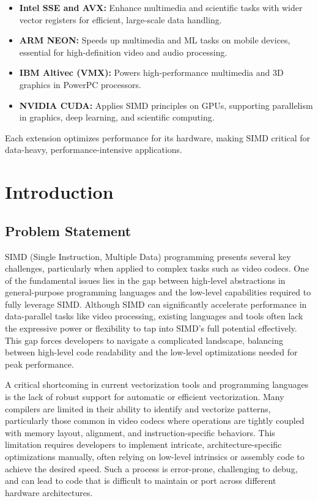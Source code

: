 \documentclass[12pt,a4paper]{article}
\begin{document}
\begin{itemize}
    \item \textbf{Intel SSE and AVX:} Enhance multimedia and scientific tasks with wider vector registers for efficient, large-scale data handling.
    
    \item \textbf{ARM NEON:} Speeds up multimedia and ML tasks on mobile devices, essential for high-definition video and audio processing.

    \item \textbf{IBM Altivec (VMX):} Powers high-performance multimedia and 3D graphics in PowerPC processors.

    \item \textbf{NVIDIA CUDA:} Applies SIMD principles on GPUs, supporting parallelism in graphics, deep learning, and scientific computing.
\end{itemize}

Each extension optimizes performance for its hardware, making SIMD critical for data-heavy, performance-intensive applications.

\section{Introduction}

\subsection{Problem Statement}
SIMD (Single Instruction, Multiple Data) programming presents several key challenges, particularly when applied to complex tasks such as video codecs. One of the fundamental issues lies in the gap between high-level abstractions in general-purpose programming languages and the low-level capabilities required to fully leverage SIMD. Although SIMD can significantly accelerate performance in data-parallel tasks like video processing, existing languages and tools often lack the expressive power or flexibility to tap into SIMD’s full potential effectively. This gap forces developers to navigate a complicated landscape, balancing between high-level code readability and the low-level optimizations needed for peak performance.

A critical shortcoming in current vectorization tools and programming languages is the lack of robust support for automatic or efficient vectorization. Many compilers are limited in their ability to identify and vectorize patterns, particularly those common in video codecs where operations are tightly coupled with memory layout, alignment, and instruction-specific behaviors. This limitation requires developers to implement intricate, architecture-specific optimizations manually, often relying on low-level intrinsics or assembly code to achieve the desired speed. Such a process is error-prone, challenging to debug, and can lead to code that is difficult to maintain or port across different hardware architectures.
\end{document}
